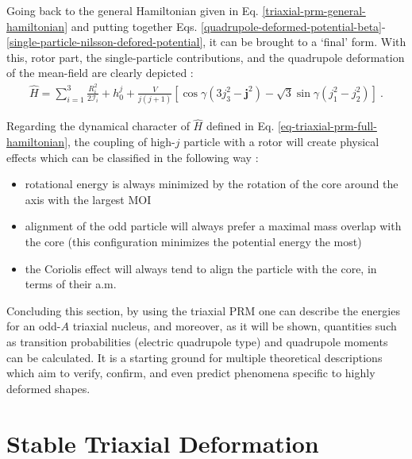 Going back to the general Hamiltonian given in Eq. \ref{triaxial-prm-general-hamiltonian} and putting together Eqs. \ref{quadrupole-deformed-potential-beta}-\ref{single-particle-nilsson-defored-potential}, it can be brought to a `final' form. With this, rotor part, the single-particle contributions, and the quadrupole deformation of the mean-field are clearly depicted \cite{ring2004nuclear}:
\begin{align}
    \hat{H}=\sum_{i=1}^3\frac{R_i^2}{2\mathcal{I}_i}+h_0^j+\frac{V}{j(j+1)}\left[\cos\gamma(3j_3^2-\mathbf{j}^2)-\sqrt{3}\sin\gamma(j_1^2-j_2^2)\right]\ .
    \label{eq-triaxial-prm-full-hamiltonian}
\end{align}

Regarding the dynamical character of $\hat{H}$ defined in Eq. \ref{eq-triaxial-prm-full-hamiltonian}, the coupling of high-$j$ particle with a rotor will create physical effects which can be classified in the following way \cite{ring2004nuclear}:
\begin{itemize}
    \item rotational energy is always minimized by the rotation of the core around the axis with the largest MOI
    \item alignment of the odd particle will always prefer a maximal mass overlap with the core (this configuration minimizes the potential energy the most)
    \item the Coriolis effect will always tend to align the particle with the core, in terms of their a.m.
\end{itemize}

Concluding this section, by using the triaxial PRM one can describe the energies for an odd-$A$ triaxial nucleus, and moreover, as it will be shown, quantities such as transition probabilities (electric quadrupole type) and quadrupole moments can be calculated. It is a starting ground for multiple theoretical descriptions which aim to verify, confirm, and even predict phenomena specific to highly deformed shapes.

\section{Stable Triaxial Deformation}
\label{potential-energy-surfaces-section}

